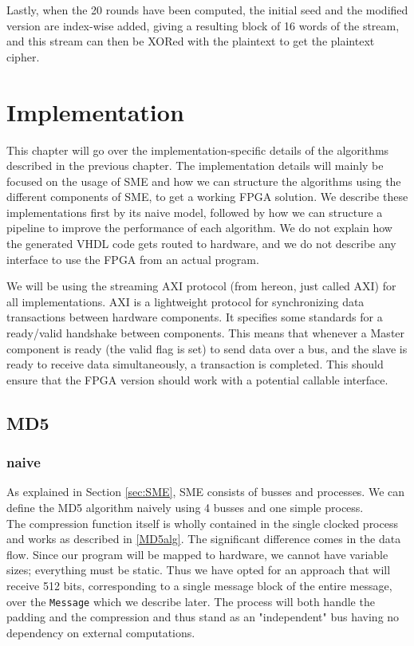 \documentclass[a4paper, openany]{book}
\begin{document}
\begin{abstact}
Lastly, when the 20 rounds have been computed, the initial seed and the modified version are index-wise added, giving a resulting block of 16 words of the stream, and this stream can then be XORed with the plaintext to get the plaintext cipher.

\chapter{Implementation}
\label{sec:org953a0f0}
This chapter will go over the implementation-specific details of the algorithms described in the previous chapter. The implementation details will mainly be focused on the usage of SME and how we can structure the algorithms using the different components of SME, to get a working FPGA solution. We describe these implementations first by its naive model, followed by how we can structure a pipeline to improve the performance of each algorithm. We do not explain how the generated VHDL code gets routed to hardware, and we do not describe any interface to use the FPGA from an actual program.

We will be using the streaming AXI protocol (from hereon, just called AXI) for all implementations. AXI is a lightweight protocol for synchronizing data transactions between hardware components. It specifies some standards for a ready/valid handshake between components. This means that whenever a Master component is ready (the valid flag is set) to send data over a bus, and the slave is ready to receive data simultaneously, a transaction is completed. This should ensure that the FPGA version should work with a potential callable interface.
\section{MD5}
\label{sec:org3fa319d}
\subsection{naive}
\label{sec:org1f7ad18}
As explained in Section \ref{sec:SME}, SME consists of busses and processes. We can define the MD5 algorithm naively using 4 busses and one simple process.\\

The compression function itself is wholly contained in the single clocked process and works as described in \ref{MD5alg}. The significant difference comes in the data flow. Since our program will be mapped to hardware, we cannot have variable sizes; everything must be static. Thus we have opted for an approach that will receive 512 bits, corresponding to a single message block of the entire message, over the \texttt{Message} which we describe later. The process will both handle the padding and the compression and thus stand as an "independent" bus having no dependency on external computations.


\end{abstact}
\end{document}
